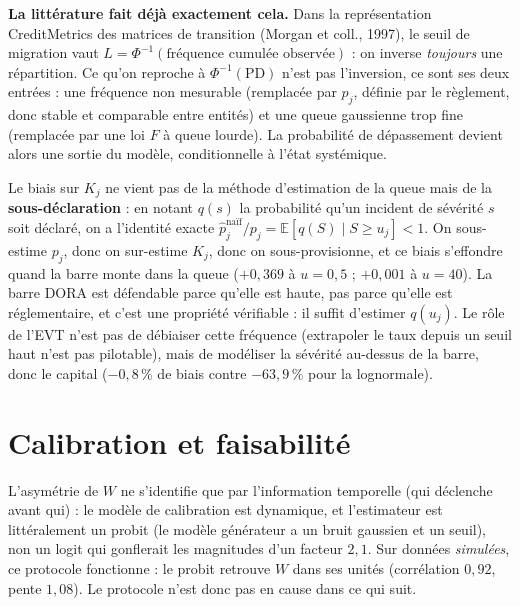 \begin{cle}
\textbf{La littérature fait déjà exactement cela.} Dans la représentation CreditMetrics des
matrices de transition (Morgan et coll., 1997), le seuil de migration vaut
$L=\Phi^{-1}(\text{fréquence cumulée observée})$ : on inverse \emph{toujours} une répartition. Ce
qu'on reproche à $\Phi^{-1}(\mathrm{PD})$ n'est pas l'inversion, ce sont ses deux entrées : une
fréquence non mesurable (remplacée par $p_j$, définie par le règlement, donc stable et
comparable entre entités) et une queue gaussienne trop fine (remplacée par une loi $F$ à queue
lourde). La probabilité de dépassement devient alors une sortie du modèle,
conditionnelle à l'état systémique.
\end{cle}

\noindent Le biais sur $K_j$ ne vient pas de la méthode d'estimation de la queue mais de la
\textbf{sous-déclaration} : en notant $q(s)$ la probabilité qu'un incident de sévérité $s$ soit
déclaré, on a l'identité exacte $\hat p_j^{\text{naïf}}/p_j=\mathbb E[q(S)\mid S\ge u_j]<1$. On
sous-estime $p_j$, donc on sur-estime $K_j$, donc on sous-provisionne, et ce biais s'effondre
quand la barre monte dans la queue ($+0{,}369$ à $u=0{,}5$ ; $+0{,}001$ à $u=40$). La
barre DORA est défendable parce qu'elle est haute, pas parce qu'elle est réglementaire, et
c'est une propriété vérifiable : il suffit d'estimer $q(u_j)$. Le rôle de l'EVT n'est pas de
débiaiser cette fréquence (extrapoler le taux depuis un seuil haut n'est pas pilotable), mais de
modéliser la sévérité au-dessus de la barre, donc le capital ($-0{,}8\,\%$ de biais
contre $-63{,}9\,\%$ pour la lognormale).


\section{Calibration et faisabilité}
\label{sec:calib-cascade}

L'asymétrie de $W$ ne s'identifie que par l'information temporelle (qui déclenche avant
qui) : le modèle de calibration est dynamique, et l'estimateur est littéralement un
probit (le modèle générateur a un bruit gaussien et un seuil), non un logit qui gonflerait les
magnitudes d'un facteur $2{,}1$. Sur données \emph{simulées}, ce protocole fonctionne : le probit
retrouve $W$ dans ses unités (corrélation $0{,}92$, pente $1{,}08$). Le protocole n'est donc pas
en cause dans ce qui suit.

